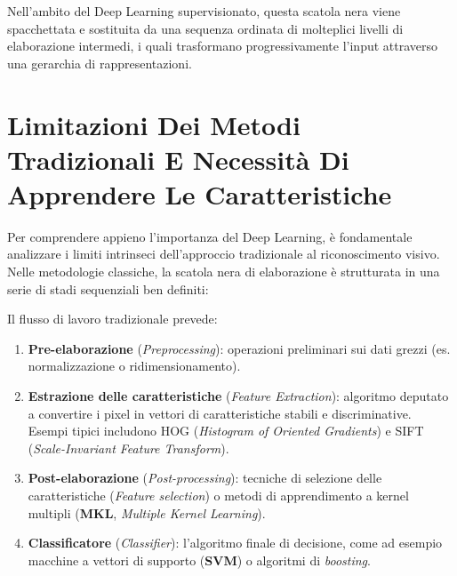 ﻿\documentclass[11pt, a4paper]{article}
\begin{document}

Nell'ambito del Deep Learning supervisionato, questa scatola nera viene spacchettata e sostituita da una sequenza ordinata di molteplici livelli di elaborazione intermedi, i quali trasformano progressivamente l'input attraverso una gerarchia di rappresentazioni.


\newpage

\section{Limitazioni Dei Metodi Tradizionali E Necessità Di Apprendere Le Caratteristiche}

Per comprendere appieno l'importanza del Deep Learning, è fondamentale analizzare i limiti intrinseci dell'approccio tradizionale al riconoscimento visivo. Nelle metodologie classiche, la scatola nera di elaborazione è strutturata in una serie di stadi sequenziali ben definiti:


Il flusso di lavoro tradizionale prevede:
\begin{enumerate}
    \item \textbf{Pre-elaborazione} (\emph{Preprocessing}): operazioni preliminari sui dati grezzi (es. normalizzazione o ridimensionamento).
    \item \textbf{Estrazione delle caratteristiche} (\emph{Feature Extraction}): algoritmo deputato a convertire i pixel in vettori di caratteristiche stabili e discriminative. Esempi tipici includono HOG (\emph{Histogram of Oriented Gradients}) e SIFT (\emph{Scale-Invariant Feature Transform}).
    \item \textbf{Post-elaborazione} (\emph{Post-processing}): tecniche di selezione delle caratteristiche (\emph{Feature selection}) o metodi di apprendimento a kernel multipli (\textbf{MKL}, \emph{Multiple Kernel Learning}).
    \item \textbf{Classificatore} (\emph{Classifier}): l'algoritmo finale di decisione, come ad esempio macchine a vettori di supporto (\textbf{SVM}) o algoritmi di \emph{boosting}.
\end{enumerate}
\end{document}
